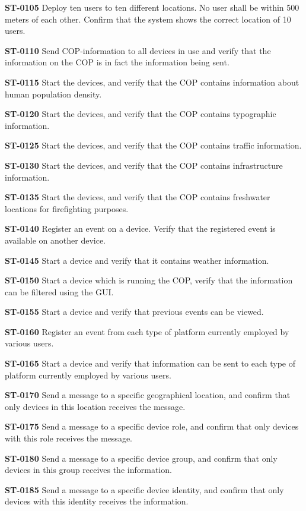 \begin{description}

\item\textbf{ST-0105} Deploy ten users to ten different locations. No user shall be within 500 meters of each other. Confirm that the system shows the correct location of 10 users. 
\item\textbf{ST-0110} Send COP-information to all devices in use and verify that the information on the COP is in fact the information being sent. 
\item\textbf{ST-0115} Start the devices, and verify that the COP contains information about human population density. 
\item\textbf{ST-0120} Start the devices, and verify that the COP contains typographic information. 
\item\textbf{ST-0125} Start the devices, and verify that the COP contains traffic information. 
\item\textbf{ST-0130} Start the devices, and verify that the COP contains infrastructure information. 
\item\textbf{ST-0135} Start the devices, and verify that the COP contains freshwater locations for firefighting purposes. 
\item\textbf{ST-0140} Register an event on a device. Verify that the registered event is available on another device. 
\item\textbf{ST-0145} Start a device and verify that it contains weather information. 
\item\textbf{ST-0150} Start a device which is running the COP, verify that the information can be filtered using the GUI. 
\item\textbf{ST-0155} Start a device and verify that previous events can be viewed. 
\item\textbf{ST-0160} Register an event from each type of platform currently employed by various users. 
\item\textbf{ST-0165} Start a device and verify that information can be sent to each type of platform currently employed by various users. 
\item\textbf{ST-0170} Send a message to a specific geographical location, and confirm that only devices in this location receives the message. 
\item\textbf{ST-0175} Send a message to a specific device role, and confirm that only devices with this role receives the message. 
\item\textbf{ST-0180} Send a message to a specific device group, and confirm that only devices in this group receives the information.
\item\textbf{ST-0185} Send a message to a specific device identity, and confirm that only devices with this identity receives the information. 

\end{description}

